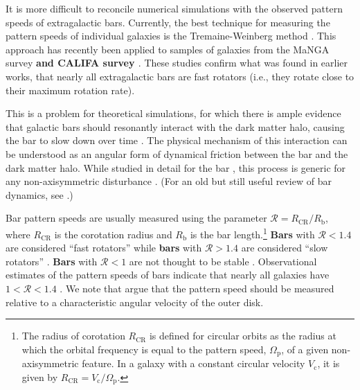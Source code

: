 \documentclass[twocolumn,linenumbers,trackchanges]{aastex631}
\newcommand{\RCR}{\ensuremath{R_{\textrm{CR}}}}
\newcommand{\Rot}{\ensuremath{\mathcal{R}}}
\newcommand{\Vc}{\ensuremath{V_{\textrm{c}} }}
\newcommand{\PS}{\ensuremath{\Omega_{\textrm{p}}}}
\newcommand{\Rb}{\ensuremath{R_{\textrm{b}}}}
\begin{document}
It is more difficult to reconcile numerical simulations with the observed
pattern speeds of extragalactic bars. Currently, the best technique for
measuring the pattern speeds of individual galaxies is the Tremaine-Weinberg
method \citep{1984ApJ...282L...5T, 2011MSAIS..18...23C}. This approach has
recently been applied to samples of galaxies from the MaNGA survey
\citep{2019MNRAS.482.1733G, 2020MNRAS.491.3655G} {\bf and CALIFA survey
\citep{2015AA...576A.102A}}. These studies confirm what was found in earlier
works, that nearly all extragalactic bars are fast rotators (i.e., they rotate
close to their maximum rotation rate).

This is a problem for theoretical simulations, for which there is ample evidence
that galactic bars should resonantly interact with the dark matter halo, causing
the bar to slow down over time \citep{1981AA....96..164C, 1992ApJ...400...80H,
2000ApJ...543..704D, 2002MNRAS.330...35A, 2002ApJ...569L..83A,
2003MNRAS.341.1179A, 2003MNRAS.346..251O, 2005MNRAS.363..991H,
2006ApJ...637..214M, 2007MNRAS.375..460W, 2009ApJ...697..293D}. The physical
mechanism of this interaction can be understood as an angular form of dynamical
friction between the bar and the dark matter halo. While studied in detail for
the bar \citep{1984MNRAS.209..729T, 1985MNRAS.213..451W}, this process is
generic for any non-axisymmetric disturbance \citep{1972MNRAS.157....1L}. (For
an old but still useful review of bar dynamics, see
\citet{1993RPPh...56..173S}.)

Bar pattern speeds are usually measured using the parameter $\Rot=\RCR/\Rb$,
where \RCR{} is the corotation radius and \Rb{} is the bar length.\footnote{The
radius of corotation \RCR{} is defined for circular orbits as the radius at
which the orbital frequency is equal to the pattern speed, \PS{}, of a given
non-axisymmetric feature. In a galaxy with a constant circular velocity \Vc{},
it is given by $\RCR = \Vc / \PS$.} {\bf Bars} with $\Rot < 1.4$ are considered
``fast rotators'' while {\bf bars} with $\Rot > 1.4$ are considered ``slow
rotators'' \citep{2000ApJ...543..704D}. {\bf Bars} with $\Rot < 1$ are not
thought to be stable \citep{1980AA....81..198C}. Observational estimates of the
pattern speeds of bars indicate that nearly all galaxies have $1 < \Rot < 1.4$
\citep{2011MSAIS..18...23C, 2015AA...576A.102A, 2019MNRAS.482.1733G,
2020MNRAS.491.3655G}. We note that \citet{2017ApJ...835..279F} argue that the
pattern speed should be measured relative to a characteristic angular velocity
of the outer disk.
\end{document}
